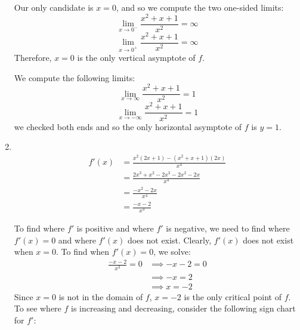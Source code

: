 \documentclass[nooutcomes]{ximera}
\begin{document}
\begin{problem}
\begin{freeResponse}
\begin{enumerate}
         Our only candidate is $x=0$, and so we compute the two one-sided limits:
       \[
         \lim_{x \to 0^-} \frac{x^2+x+1}{x^2} = \infty 
       \]
       \[
         \lim_{x \to 0^+} \frac{x^2+x+1}{x^2} = \infty
       \]
       Therefore, $x=0$ is the only vertical asymptote of $f$.

         We compute the following limits:
       \[
         \lim_{x \to \infty} \frac{x^2+x+1}{x^2} = 1
       \]
       \[
         \lim_{x \to -\infty} \frac{x^2+x+1}{x^2} = 1
       \]
       we checked both ends and so the only horizontal asymptote of $f$ is $y=1$.
			

			
     \item
         \\

       \begin{align*}
         f'(x) &= \frac{x^2(2x+1) - (x^2+x+1)(2x)}{x^4} \\
               &= \frac{2x^3 + x^2 - 2x^3 - 2x^2 - 2x}{x^4} \\
               &= \frac{-x^2 - 2x}{x^4} \\
               &= \frac{-x-2}{x^3}
       \end{align*}
			
       To find where $f'$ is positive and where $f'$ is negative, we need to find where $f'(x) = 0$ and where $f'(x)$ does not exist.
       Clearly, $f'(x)$ does not exist when $x=0$.
       To find when $f'(x) = 0$, we solve:
       \begin{align*}
         \frac{-x-2}{x^3} = 0 &\implies -x-2 = 0 \\
         &\implies -x = 2\\
         &\implies x = -2
       \end{align*}
       Since $x=0$ is not in the domain of $f$, $x=-2$ is the only critical point of $f$.
       To see where $f$ is increasing and decreasing, consider the following sign chart for $f'$:
       \begin{center}
         \begin{image}
         \end{image}
       \end{center}


\end{enumerate}
\end{freeResponse}
\end{problem}
\end{document}
